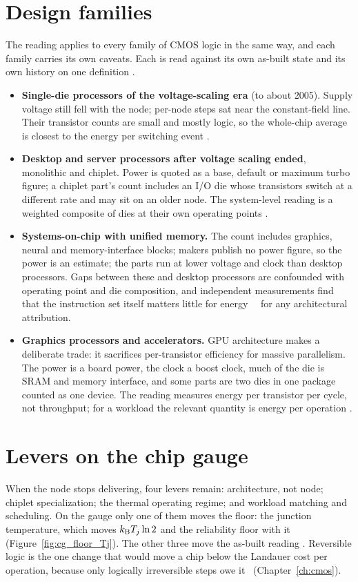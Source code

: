 \section{Design families}\label{sec:cg_families}
The reading applies to every family of CMOS logic in the same way, and each family carries its own caveats. Each is read against its own
as-built state and its own history on one definition \interp.
\begin{itemize}
\item \textbf{Single-die processors of the voltage-scaling era} (to about 2005). Supply voltage still fell with the node; per-node steps sat
near the constant-field line. Their transistor counts are small and mostly logic, so the whole-chip average is closest to the energy per
switching event \interp.
\item \textbf{Desktop and server processors after voltage scaling ended}, monolithic and chiplet. Power is quoted as a base, default or
maximum turbo figure; a chiplet part's count includes an I/O die whose transistors switch at a different rate and may sit on an older node.
The system-level reading is a weighted composite of dies at their own operating points \interp.
\item \textbf{Systems-on-chip with unified memory.} The count includes graphics, neural and memory-interface blocks; makers publish no power
figure, so the power is an estimate; the parts run at lower voltage and clock than desktop processors. Gaps between these and desktop
processors are confounded with operating point and die composition, and independent measurements find that the instruction set itself matters
little for energy~\cite{Blem2013} \conjecture\ for any architectural attribution.
\item \textbf{Graphics processors and accelerators.} GPU architecture makes a deliberate trade: it sacrifices per-transistor efficiency for
massive parallelism. The power is a board power, the clock a boost clock, much of the die is SRAM and memory interface, and some parts are two
dies in one package counted as one device. The reading measures energy per transistor per cycle, not throughput; for a workload the relevant
quantity is energy per operation \interp.
\end{itemize}

\section{Levers on the chip gauge}\label{sec:cg_levers}
When the node stops delivering, four levers remain: architecture, not node; chiplet specialization; the thermal operating regime; and
workload matching and scheduling. On the gauge only one of them moves the floor: the junction temperature, which moves $k_{\mathrm B} T_j\ln2$ and the
reliability floor with it (Figure~\ref{fig:cg_floor_Tj}). The other three move the as-built reading \interp. Reversible logic is the one change
that would move a chip below the Landauer cost per operation, because only logically irreversible steps owe it~\cite{Bennett1973}
(Chapter~\ref{ch:cmos}).


